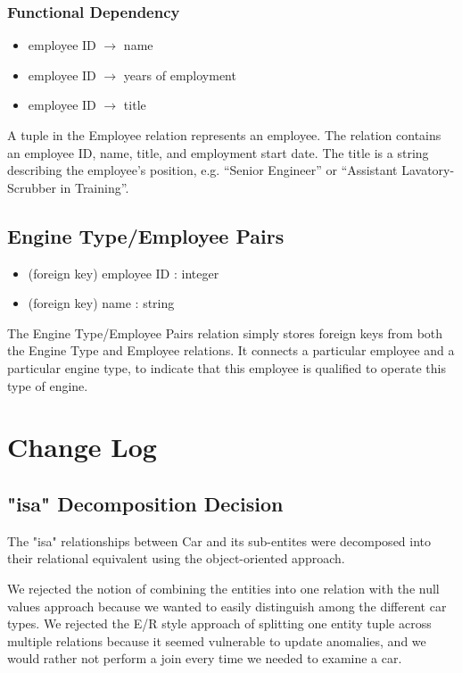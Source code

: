 \documentclass[a4paper]{article}
\begin{document}
\subsubsection*{Functional Dependency}
\begin{itemize}
\item employee ID  $\rightarrow$ name
\item employee ID  $\rightarrow$ years of employment
\item employee ID  $\rightarrow$ title
\end{itemize}
A tuple in the Employee relation represents an employee. The relation contains an employee ID, name, title, and employment start date. The title is a string describing the employee’s position, e.g. “Senior Engineer” or “Assistant Lavatory-Scrubber in Training”.

\subsection*{Engine Type/Employee Pairs}
\begin{itemize}
\item (foreign key) employee ID : integer
\item (foreign key) name : string
\end{itemize}
The Engine Type/Employee Pairs relation simply stores foreign keys from both the Engine Type and Employee relations. It connects a particular employee and a particular engine type, to indicate that this employee is qualified to operate this type of engine.


\section{Change Log}
\subsection*{"isa" Decomposition Decision}
The "isa" relationships between Car and its sub-entites were decomposed into their relational equivalent using the object-oriented approach.

We rejected the notion of combining the entities into one relation with the null values approach because we wanted to easily distinguish among the different car types. We rejected the E/R style approach of splitting one entity tuple across multiple relations because it seemed vulnerable to update anomalies, and we would rather not perform a join every time we needed to examine a car.
\end{document}
